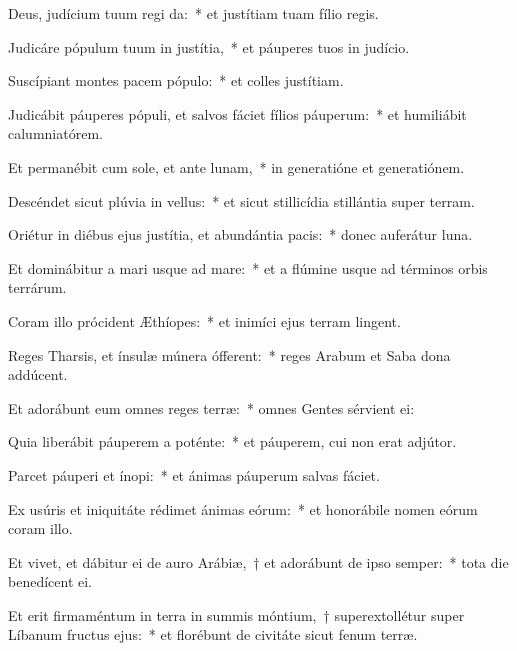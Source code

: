 \item Deus, judícium tuum regi da:~* et justítiam tuam fílio regis.

\item Judicáre pópulum tuum in justítia,~* et páuperes tuos in judício.

\item Suscípiant montes pacem pópulo:~* et colles justítiam.

\item Judicábit páuperes pópuli, et salvos fáciet fílios páuperum:~* et humiliábit calumniatórem.

\item Et permanébit cum sole, et ante lunam,~* in generatióne et generatiónem.

\item Descéndet sicut plúvia in vellus:~* et sicut stillicídia stillántia super terram.

\item Oriétur in diébus ejus justítia, et abundántia pacis:~* donec auferátur luna.

\item Et dominábitur a mari usque ad mare:~* et a flúmine usque ad términos orbis terrárum.

\item Coram illo prócident Æthíopes:~* et inimíci ejus terram lingent.

\item Reges Tharsis, et ínsulæ múnera ófferent:~* reges Arabum et Saba dona addúcent.

\item Et adorábunt eum omnes reges terræ:~* omnes Gentes sérvient ei:

\item Quia liberábit páuperem a poténte:~* et páuperem, cui non erat adjútor.

\item Parcet páuperi et ínopi:~* et ánimas páuperum salvas fáciet.

\item Ex usúris et iniquitáte rédimet ánimas eórum:~* et honorábile nomen eórum coram illo.

\item Et vivet, et dábitur ei de auro Arábiæ,~† et adorábunt de ipso semper:~* tota die benedícent ei.

\item Et erit firmaméntum in terra in summis móntium,~† superextollétur super Líbanum fructus ejus:~* et florébunt de civitáte sicut fenum terræ.

